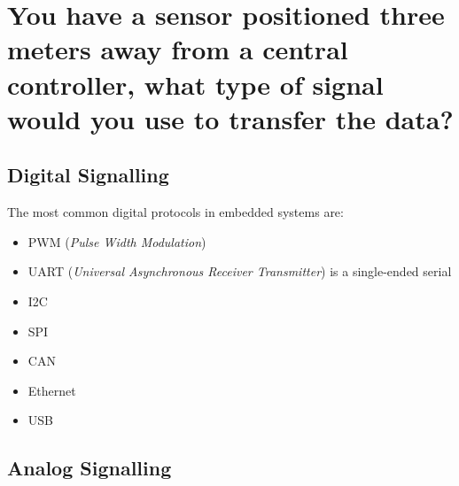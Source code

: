\documentclass[main.tex]{subfiles}
\begin{document}
\section{You have a sensor positioned three meters away from a central controller, what type of signal would you use to transfer the data?}

\subsection{Digital Signalling}



The most common digital protocols in embedded systems are:
\begin{itemize}
    \item PWM (\textit{Pulse Width Modulation})
    \item UART (\textit{Universal Asynchronous Receiver Transmitter}) is a single-ended serial
    \item I2C
    \item SPI
    \item CAN
    \item Ethernet
    \item USB
\end{itemize}

\subsection{Analog Signalling}
\end{document}
